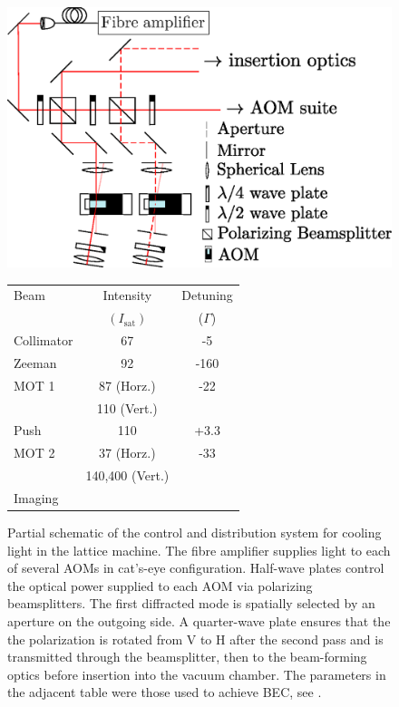 	\begin{figure}
	    \begin{minipage}{0.45\textwidth}
	    \vspace{0pt}
			\caption{Partial schematic of the control and distribution system for cooling light in the lattice machine.
	The fibre amplifier supplies light to each of several AOMs in cat's-eye configuration.
	Half-wave plates control the optical power supplied to each AOM via polarizing beamsplitters.
	The first diffracted mode is spatially selected by an aperture on the outgoing side.
	A quarter-wave plate ensures that the the polarization is rotated from V to H after the second pass and is transmitted through the beamsplitter, then to the beam-forming optics before insertion into the vacuum chamber.
	The parameters in the adjacent table were those used to achieve BEC, see \cite{Abbas21}.}
	    \label{fig:distribution_optics}
		\end{minipage}
	    \hfill
	    \vspace{5pt}
		\begin{minipage}{0.5\textwidth}
			\vspace{0pt}
			\includegraphics[width=\textwidth]{fig/lattice/distribution_optics}
		  {\fontsize{11}{13}
		  \begin{tabular}{l c c}
		  \hline\hline
		  Beam & Intensity & Detuning \\
		   & $(I_\textrm{sat})$ & ($\Gamma$) \\
		  \hline
		  Collimator &67& -5\\
		  Zeeman &92&-160 \\
		  MOT 1 &87 (Horz.)&-22 \\
		  		&110 (Vert.) & \\
		  Push &110&+3.3 \\
		  MOT 2 &37 (Horz.)& -33\\
		   &140,400 (Vert.)& \\
		  Imaging && \\
		  \hline
		  \end{tabular}}
	    \end{minipage}
	\end{figure}

